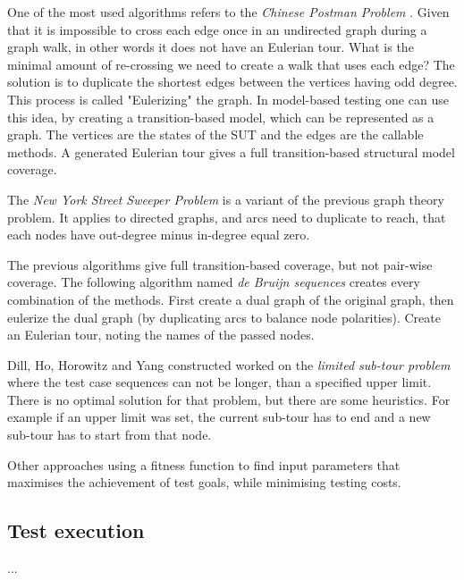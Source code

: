 One of the most used algorithms refers to the \textit{Chinese Postman Problem} \cite{graphtheorymbt}. Given that it is impossible to cross each edge once in an undirected graph during a graph walk, in other words it does not have an Eulerian tour. What is the minimal amount of re-crossing we need to create a walk that uses each edge? The solution is to duplicate the shortest edges between the vertices having odd degree. This process is called "Eulerizing" the graph. In model-based testing one can use this idea, by creating a transition-based model, which can be represented as a graph. The vertices are the states of the SUT and the edges are the callable methods. A generated Eulerian tour gives a full transition-based structural model coverage.

The \textit{New York Street Sweeper Problem} is a variant of the previous graph theory problem. It applies to directed graphs, and arcs need to duplicate to reach, that each nodes have out-degree minus in-degree equal zero.

The previous algorithms give full transition-based coverage, but not pair-wise coverage. The following algorithm named \textit{de Bruijn sequences} creates every combination of the methods. First create a dual graph of the original graph, then eulerize the dual graph (by duplicating arcs to balance node polarities). Create an Eulerian tour, noting the names of the passed nodes.

Dill, Ho, Horowitz and Yang constructed worked on the \textit{limited sub-tour problem} where the test case sequences can not be longer, than a specified upper limit. There is no optimal solution for that problem, but there are some heuristics. For example if an upper limit was set, the current sub-tour has to end and a new sub-tour has to start from that node.

Other approaches using a fitness function to find input parameters that maximises the achievement of test goals, while minimising testing costs.



\subsection{Test execution}
\label{sub:testexecution}

...



